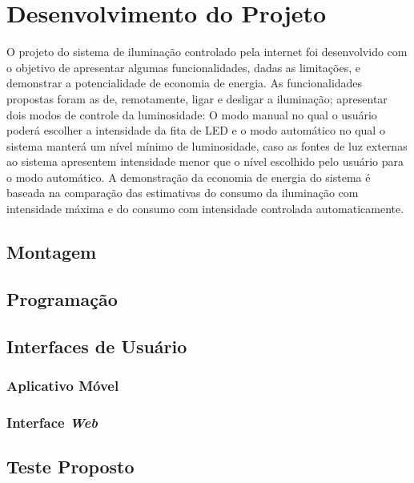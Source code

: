 \chapter{Desenvolvimento do Projeto}

O projeto do sistema de iluminação controlado pela internet foi desenvolvido com o objetivo de apresentar algumas funcionalidades, dadas as limitações, e demonstrar a potencialidade de economia de energia. As funcionalidades propostas foram as de, remotamente, ligar e desligar a iluminação; apresentar dois modos de controle da luminosidade: O modo manual no qual o usuário poderá escolher a intensidade da fita de LED e o modo automático no qual o sistema manterá um nível mínimo de luminosidade, caso as fontes de luz externas ao sistema apresentem intensidade menor que o nível escolhido pelo usuário para o modo automático. A demonstração da economia de energia do sistema é baseada na comparação das estimativas do consumo da iluminação com intensidade máxima e do consumo com intensidade controlada automaticamente.

\section{Montagem}

\section{Programação}

\section{Interfaces de Usuário}

\subsection{Aplicativo Móvel}

\subsection{Interface \textit{Web}}

\section{Teste Proposto}